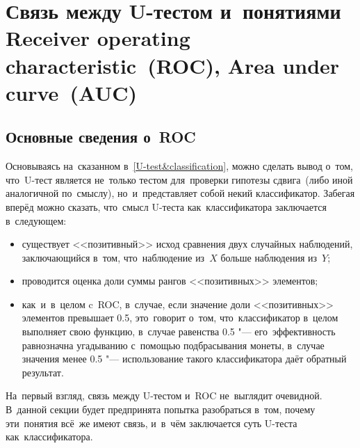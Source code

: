 \documentclass[]{scrreprt}
\begin{document}
\section{Связь между U-тестом и~понятиями \foreignlanguage{english}{Receiver operating characteristic~(ROC), Area under curve~(AUC)}}\label{U-AUC}
%
\subsection{Основные сведения о~ROC}
Основываясь на~сказанном в~\ref{U-test&classification}, можно сделать вывод о~том, что~U-тест является не~только тестом для~проверки гипотезы сдвига~(либо иной аналогичной по~смыслу), но~и~представляет собой некий классификатор. Забегая вперёд можно сказать, что~смысл U-теста как~классификатора заключается в~следующем:
\begin{itemize}
	\item существует <<позитивный>> исход сравнения двух случайных наблюдений, заключающийся в~том, что~наблюдение из~$X$ больше наблюдения из~$Y$;
	\item проводится оценка доли суммы рангов <<позитивных>> элементов;
	\item как~и~в~целом c~ROC, в~случае, если значение доли <<позитивных>> элементов превышает 0.5, это~говорит о~том, что~классификатор в~целом выполняет свою функцию, в~случае равенства 0.5 "--- его~эффективность равнозначна угадыванию с~помощью подбрасывания монеты, в~случае значения менее 0.5 "--- использование такого классификатора даёт обратный результат.	 
\end{itemize}
На~первый взгляд, связь между U-тестом и~ROC не~выглядит очевидной. В~данной секции будет предпринята попытка разобраться в~том, почему эти~понятия всё~же имеют связь, и~в~чём заключается суть U-теста как~классификатора.
\end{document}

